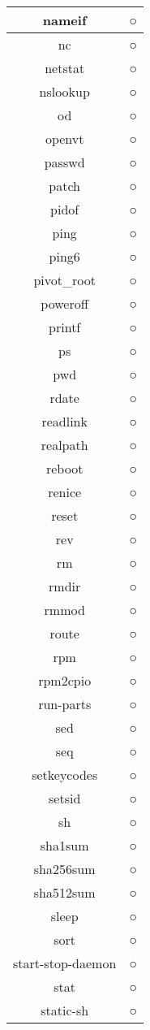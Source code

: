 \begin{longtable}{cc}
nameif & ○ \\ \hline
nc & ○ \\ \hline
netstat & ○ \\ \hline
nslookup & ○ \\ \hline
od & ○ \\ \hline
openvt & ○ \\ \hline
passwd & ○ \\ \hline
patch & ○ \\ \hline
pidof & ○ \\ \hline
ping & ○ \\ \hline
ping6 & ○ \\ \hline
pivot\_root & ○ \\ \hline
poweroff & ○ \\ \hline
printf & ○ \\ \hline
ps & ○ \\ \hline
pwd & ○ \\ \hline
rdate & ○ \\ \hline
readlink & ○ \\ \hline
realpath & ○ \\ \hline
reboot & ○ \\ \hline
renice & ○ \\ \hline
reset & ○ \\ \hline
rev & ○ \\ \hline
rm & ○ \\ \hline
rmdir & ○ \\ \hline
rmmod & ○ \\ \hline
route & ○ \\ \hline
rpm & ○ \\ \hline
rpm2cpio & ○ \\ \hline
run-parts & ○ \\ \hline
sed & ○ \\ \hline
seq & ○ \\ \hline
setkeycodes & ○ \\ \hline
setsid & ○ \\ \hline
sh & ○ \\ \hline
sha1sum & ○ \\ \hline
sha256sum & ○ \\ \hline
sha512sum & ○ \\ \hline
sleep & ○ \\ \hline
sort & ○ \\ \hline
start-stop-daemon & ○ \\ \hline
stat & ○ \\ \hline
static-sh & ○ \\ \hline

\end{longtable}
